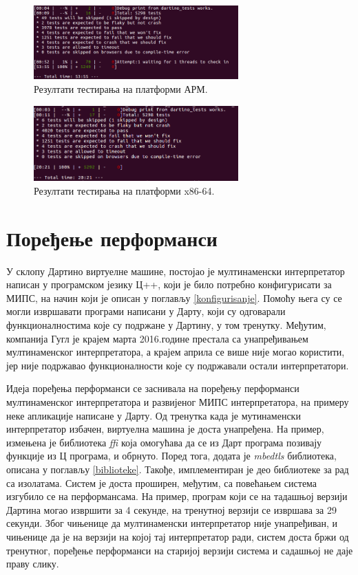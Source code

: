 \documentclass[12pt,oneside]{memoir}
\begin{document}
\begin{figure}[!ht]
  \centering
  \includegraphics[width=0.7\textwidth]{testovi-arm.png}
  \caption{Резултати тестирања на платформи АРМ.}
  \label{fig:arm}
\end{figure}

\begin{figure}[!ht]
  \centering
  \includegraphics[width=0.7\textwidth]{testovi_x64.png}
  \caption{Резултати тестирања на платформи x86-64.}
  \label{fig:x86}
\end{figure}

\section{Поређење перформанси}
\label{performanse}
У склопу Дартино виртуелне машине, постојао је мултинаменски интерпретатор написан у програмском језику Ц++, који је било потребно конфигурисати за МИПС, на начин који је описан у поглављу \ref{konfigurisanje}. Помоћу њега су се могли извршавати програми написани у Дарту, који су одговарали функционалностима које су подржане у Дартину, у том тренутку. Међутим, компанија Гугл је крајем марта 2016.године престала са унапређивањем мултинаменског интерпретатора, а крајем априла се више није могао користити, јер није подржавао функционалности које су подржавали остали интерпретатори.

Идеја поређења перформанси се заснивала на поређењу перформанси мултинаменског интерпретатора и развијеног МИПС интерпретатора, на примеру неке апликације написане у Дарту. Од тренутка када је мутинаменски интерпретатор избачен, виртуелна машина је доста унапређена. На пример, измењена је библиотека \textit{ffi} која омогућава да се из Дарт програма позивају функције из Ц програма, и обрнуто. Поред тога, додата је \textit{mbedtls} библиотека, описана у поглављу \ref{biblioteke}. Такође, имплементиран је део библиотеке за рад са изолатама. Систем је доста проширен, међутим, са повећањем система изгубило се на перформансама. На пример, програм који се на тадашњој верзији Дартина могао извршити за 4 секунде, на тренутној верзији се извршава за 29 секунди. Због чињенице да мултинаменски интерпретатор није унапређиван, и чињенице да је на верзији на којој тај интерпретатор ради, систем доста бржи од тренутног, поређење перформанси на старијој верзији система и садашњој не даје праву слику.
\end{document}
